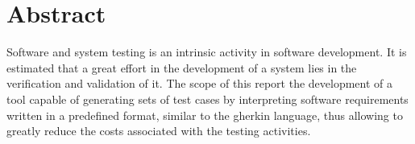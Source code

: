 
\chapter*{Abstract}

Software and system testing is an intrinsic activity in software development. It is estimated that a great effort in the development of a system lies in the verification and validation of it. The scope of this report the development of a tool capable of generating sets of test cases by interpreting software requirements written in a predefined format, similar to the gherkin language, thus allowing to greatly reduce the costs associated with the testing activities.
